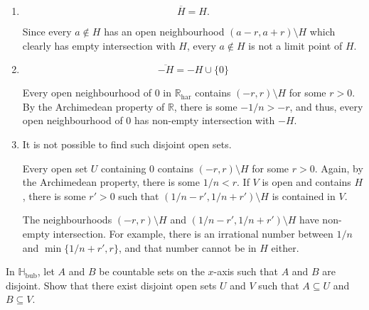 \documentclass[12 pt, letterpaper]{hmcpset}
\begin{document}
\begin{solution}
	\begin{enumerate}
		\item
			\[
				\boxed{
					\overline{H} = H.
				}
			\]

			Since every $a \notin H$ has an open neighbourhood $(a - r, a + r) \setminus H$ which clearly has empty intersection with $H$, every $a \notin H$ is not a limit point of $H$.
		\item
			\[
				\boxed{
					\overline{- H} = -H \cup \{ 0 \}
				}
			\]

			Every open neighbourhood of $0$ in $\mathbb{R}_{\text{har}}$ contains $(-r, r) \setminus H$ for some $r > 0$. By the Archimedean property of $\mathbb{R}$, there is some $-1 / n > -r$, and thus, every open neighbourhood of $0$ has non-empty intersection with $-H$.
		\item It is not possible to find such disjoint open sets.

			Every open set $U$ containing $0$ contains $(-r, r) \setminus H$ for some $r > 0$. Again, by the Archimedean property, there is some $1 / n < r$. If $V$ is open and contains $H$, there is some $r' > 0$ such that $(1/n - r', 1/n + r') \setminus H$ is contained in $V$.

			The neighbourhoods $(-r, r) \setminus H$ and $(1/n - r', 1/n + r') \setminus H$ have non-empty intersection. For example, there is an irrational number between $1 / n$ and $\min \{ 1/n + r', r \}$, and that number cannot be in $H$ either.
	\end{enumerate}
\end{solution}

\pagebreak

\begin{problem}[3.10 (4)]
	In $\mathbb{H}_{\text{bub}}$, let $A$ and $B$ be countable sets on the $x$-axis such that $A$ and $B$ are disjoint. Show that there exist disjoint open sets $U$ and $V$ such that $A \subseteq U$ and $B \subseteq V$.
\end{problem}
\end{document}
